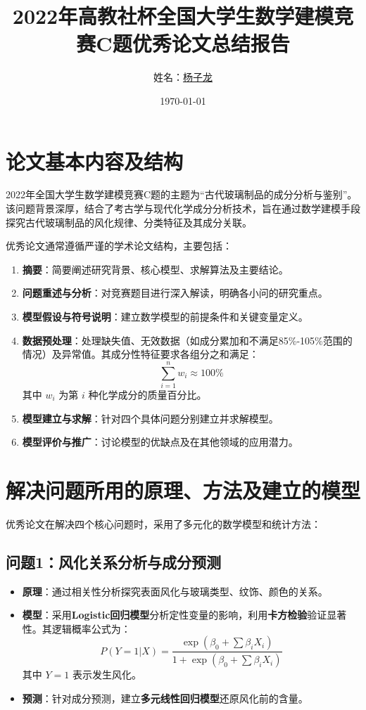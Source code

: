 \documentclass[UTF8, zihao=-4]{ctexart}
\title{2022年高教社杯全国大学生数学建模竞赛C题优秀论文总结报告}
\author{姓名：\underline{杨子龙}}
\date{\today}
\begin{document}
\maketitle
\onehalfspacing

\section{论文基本内容及结构}
2022年全国大学生数学建模竞赛C题的主题为“古代玻璃制品的成分分析与鉴别”。该问题背景深厚，结合了考古学与现代化学成分分析技术，旨在通过数学建模手段探究古代玻璃制品的风化规律、分类特征及其成分关联。

优秀论文通常遵循严谨的学术论文结构，主要包括：
\begin{enumerate}
    \item \textbf{摘要}：简要阐述研究背景、核心模型、求解算法及主要结论。
    \item \textbf{问题重述与分析}：对竞赛题目进行深入解读，明确各小问的研究重点。
    \item \textbf{模型假设与符号说明}：建立数学模型的前提条件和关键变量定义。
    \item \textbf{数据预处理}：处理缺失值、无效数据（如成分累加和不满足85\%-105\%范围的情况）及异常值。其成分性特征要求各组分之和满足：
    \begin{equation}
        \sum_{i=1}^{n} w_i \approx 100\%
    \end{equation}
    其中 $w_i$ 为第 $i$ 种化学成分的质量百分比。
    \item \textbf{模型建立与求解}：针对四个具体问题分别建立并求解模型。
    \item \textbf{模型评价与推广}：讨论模型的优缺点及在其他领域的应用潜力。
\end{enumerate}

\section{解决问题所用的原理、方法及建立的模型}
优秀论文在解决四个核心问题时，采用了多元化的数学模型和统计方法：

\subsection{问题1：风化关系分析与成分预测}
\begin{itemize}
    \item \textbf{原理}：通过相关性分析探究表面风化与玻璃类型、纹饰、颜色的关系。
    \item \textbf{模型}：采用\textbf{Logistic回归模型}分析定性变量的影响，利用\textbf{卡方检验}验证显著性。其逻辑概率公式为：
    \begin{equation}
        P(Y=1|X) = \frac{\exp(\beta_0 + \sum \beta_i X_i)}{1 + \exp(\beta_0 + \sum \beta_i X_i)}
    \end{equation}
    其中 $Y=1$ 表示发生风化。
    \item \textbf{预测}：针对成分预测，建立\textbf{多元线性回归模型}还原风化前的含量。
\end{itemize}
\end{document}
